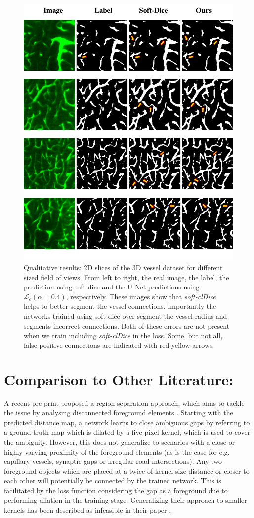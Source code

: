 \begin{figure}[]
\label{supp_3d}
\centering

\includegraphics[width=0.78\linewidth]{figs/suppl/Appendix_3D_clDice_qualitative_results.pdf}
\caption{\footnotesize Qualitative results: 2D slices of the 3D vessel dataset for different sized field of views. From left to right, the real image, the label, the prediction using soft-dice and the U-Net predictions using $\mathcal{L}_c (\alpha=0.4)$, respectively. These images show that \textit{soft-clDice} helps to better segment the vessel connections. Importantly the networks trained using soft-dice over-segment the vessel radius and segments incorrect connections. Both of these errors are not present when we train including \textit{soft-clDice} in the loss. Some,  but  not  all, false positive connections are indicated with red-yellow arrows.
}
\end{figure}

\section{Comparison to Other Literature:} 

A recent pre-print proposed a region-separation approach, which aims to tackle the issue by analysing disconnected foreground elements \cite{oner2020promoting}. Starting with the predicted distance map, a network learns to close ambiguous gaps by referring to a ground truth map which is dilated by a five-pixel kernel, which is used to cover the ambiguity. However, this does not generalize to scenarios with a close or highly varying proximity of the foreground elements (as is the case for e.g. capillary vessels, synaptic gaps or irregular road intersections). Any two foreground objects which are placed at a twice-of-kernel-size distance or closer to each other will potentially be connected by the trained network. This is facilitated by the loss function considering the gap as a foreground due to performing dilation in the training stage. Generalizing their approach to smaller kernels has been described as infeasible in their paper \cite{oner2020promoting}.

